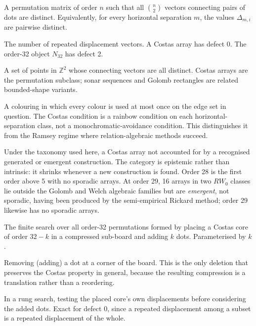 \documentclass[11pt,a4paper]{article}
\theoremstyle{definition}
\newcommand{\Z}{\mathbb{Z}}
\begin{document}
\begin{description}[style=nextline,leftmargin=0pt]

\item[Costas array] A permutation matrix of order $n$ such that all
$\binom{n}{2}$ vectors connecting pairs of dots are distinct. Equivalently, for
every horizontal separation $m$, the values $\Delta_{m,i}$ are pairwise
distinct.

\item[Defect / score] The number of repeated displacement vectors. A Costas
array has defect 0. The order-32 object $N_{32}$ has defect 2.

\item[Distinct difference configuration (DDC)] A set of points in $\Z^2$ whose
connecting vectors are all distinct. Costas arrays are the permutation subclass;
sonar sequences and Golomb rectangles are related bounded-shape variants.

\item[Rainbow / anti-Ramsey] A colouring in which every colour is used at most
once on the edge set in question. The Costas condition is a rainbow condition on
each horizontal-separation class, not a monochromatic-avoidance condition. This
distinguishes it from the Ramsey regime where relation-algebraic methods succeed.

\item[Sporadic array] Under the taxonomy used here, a Costas array not
accounted for by a recognised generated or emergent construction. The category is
epistemic rather than intrinsic: it shrinks whenever a new construction is found.
Order 28 is the first order above 5 with no sporadic arrays. At order 29, 16
arrays in two $RW_0$ classes lie outside the Golomb and Welch algebraic families
but are \emph{emergent}, not sporadic, having been produced by the semi-empirical
Rickard method; order 29 likewise has no sporadic arrays.

\item[Augmentation rung] The finite search over all order-32 permutations formed
by placing a Costas core of order $32-k$ in a compressed sub-board and adding
$k$ dots. Parameterised by $k$.

\item[Corner deletion / addition] Removing (adding) a dot at a corner of the
board. This is the only deletion that preserves the Costas property in general,
because the resulting compression is a translation rather than a reordering.

\item[Core-first pruning] In a rung search, testing the placed core's own
displacements before considering the added dots. Exact for defect 0, since a
repeated displacement among a subset is a repeated displacement of the whole.


\end{description}
\end{document}
